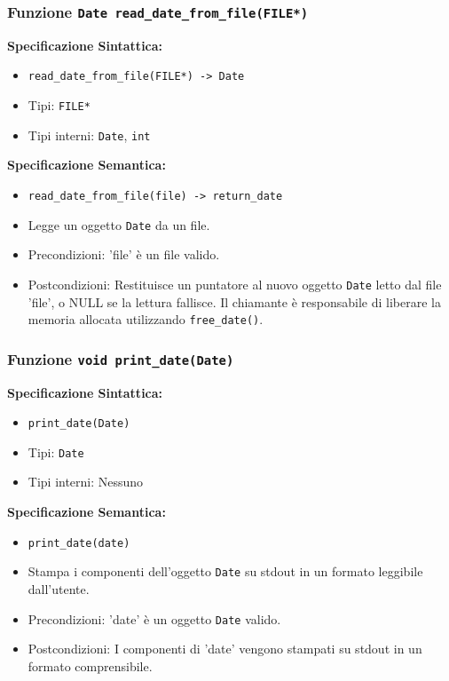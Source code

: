 \documentclass[11pt]{scrartcl} %
\begin{document}
\subsubsection{Funzione \texttt{Date read\_date\_from\_file(FILE*)}}

\textbf{Specificazione Sintattica:}
\begin{itemize}
	\item \texttt{read\_date\_from\_file(FILE*) -> Date}
	\item Tipi: \texttt{FILE*}
	\item Tipi interni: \texttt{Date}, \texttt{int}
\end{itemize}

\textbf{Specificazione Semantica:}
\begin{itemize}
	\item \texttt{read\_date\_from\_file(file) -> return\_date}
	\item Legge un oggetto \texttt{Date} da un file.
	\item Precondizioni: 'file' è un file valido.
	\item Postcondizioni: Restituisce un puntatore al nuovo oggetto \texttt{Date} letto dal file 'file', o NULL se la lettura fallisce. Il chiamante è responsabile di liberare la memoria allocata utilizzando \texttt{free\_date()}.
\end{itemize}

\subsubsection{Funzione \texttt{void print\_date(Date)}}

\textbf{Specificazione Sintattica:}
\begin{itemize}
	\item \texttt{print\_date(Date)}
	\item Tipi: \texttt{Date}
	\item Tipi interni: Nessuno
\end{itemize}

\textbf{Specificazione Semantica:}
\begin{itemize}
	\item \texttt{print\_date(date)}
	\item Stampa i componenti dell'oggetto \texttt{Date} su stdout in un formato leggibile dall'utente.
	\item Precondizioni: 'date' è un oggetto \texttt{Date} valido.
	\item Postcondizioni: I componenti di 'date' vengono stampati su stdout in un formato comprensibile.
\end{itemize}
\end{document}
